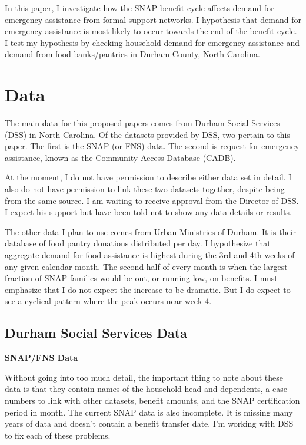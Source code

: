 \documentclass[12pt,letterpaperpaper,]{book}
\begin{document}
In this paper, I investigate how the SNAP benefit cycle affects demand
for emergency assistance from formal support networks. I hypothesis that
demand for emergency assistance is most likely to occur towards the end
of the benefit cycle. I test my hypothesis by checking household demand
for emergency assistance and demand from food banks/pantries in Durham
County, North Carolina.

\section*{Data}\label{data-3}

The main data for this proposed papers comes from Durham Social Services
(DSS) in North Carolina. Of the datasets provided by DSS, two pertain to
this paper. The first is the SNAP (or FNS) data. The second is request
for emergency assistance, known as the Community Access Database (CADB).

At the moment, I do not have permission to describe either data set in
detail. I also do not have permission to link these two datasets
together, despite being from the same source. I am waiting to receive
approval from the Director of DSS. I expect his support but have been
told not to show any data details or results.

The other data I plan to use comes from Urban Ministries of Durham. It
is their database of food pantry donations distributed per day. I
hypothesize that aggregate demand for food assistance is highest during
the 3rd and 4th weeks of any given calendar month. The second half of
every month is when the largest fraction of SNAP families would be out,
or running low, on benefits. I must emphasize that I do not expect the
increase to be dramatic. But I do expect to see a cyclical pattern where
the peak occurs near week 4.

\subsection*{Durham Social Services
Data}\label{durham-social-services-data}

\textbf{SNAP/FNS Data}

Without going into too much detail, the important thing to note about
these data is that they contain names of the household head and
dependents, a case numbers to link with other datasets, benefit amounts,
and the SNAP certification period in month. The current SNAP data is
also incomplete. It is missing many years of data and doesn't contain a
benefit transfer date. I'm working with DSS to fix each of these
problems.
\end{document}
